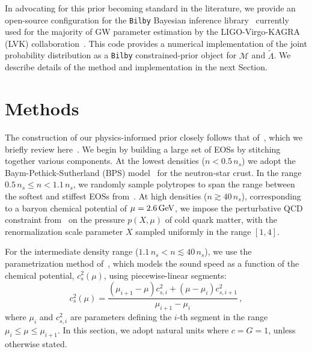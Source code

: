 \documentclass[twocolumn,linenumbers]{aastex631}
\begin{document}
In advocating for this prior becoming standard in the literature, we
provide an open-source configuration for the \texttt{Bilby} Bayesian
inference library~\citep{ashton19,romeroshaw20} currently used for the
majority of GW parameter estimation by the LIGO-Virgo-KAGRA (LVK)
collaboration~\citep[e.g.,][]{LIGO, Virgo, KAGRA}. This code provides a
numerical implementation of the joint probability distribution as a
\texttt{Bilby} constrained-prior object for $\mathcal{M}$ and
$\tilde{\Lambda}$. We describe details of the method and implementation
in the next Section.


\section{Methods}
\label{sec:Methods}
	
The construction of our physics-informed prior closely follows that
of~\citet{Altiparmak:2022}, which we briefly review here~\citep[see][for
  additional details]{Ecker:2022, Ecker:2022dlg}. We begin by building a
large set of EOSs by stitching together various components. At the
lowest densities ($n<0.5\,n_s$) we adopt the Baym-Pethick-Sutherland
(BPS) model~\citep{Baym71} for the neutron-star crust. In the range
$0.5\,n_s\le n < 1.1\,n_s$, we randomly sample polytropes to span the
range between the softest and stiffest EOSs
from~\citet{Hebeler:2013nza}. At high densities ($n \gtrsim 40\,n_s$),
corresponding to a baryon chemical potential of $\mu = 2.6\,\rm GeV$, we
impose the perturbative QCD constraint from~\citet{Fraga2014} on the
pressure $p(X, \mu)$ of cold quark matter, with the renormalization scale
parameter $X$ sampled uniformly in the range $[1,4]$.
	
For the intermediate density range ($1.1\,n_s < n \lesssim 40\,n_s$), we
use the parametrization method of~\citet{Annala2019}, which models the
sound speed as a function of the chemical potential, $c_s^2(\mu)$, using
piecewise-linear segments:
%
\begin{equation} \label{eq:cs2}
 c_s^2(\mu) = \frac{\left(\mu_{i+1}-\mu \right) c_{s,i}^2 + \left(\mu -
   \mu_i \right) c_{s,i+1}^2}{\mu_{i+1}-\mu_i}\,,
\end{equation}
%
where $\mu_i$ and $c_{s,i}^2$ are parameters defining the $i$-th segment
in the range $\mu_i \leq \mu \leq \mu_{i+1}$. In this section, we
adopt natural units where $c=G=1$, unless otherwise stated.
\end{document}
